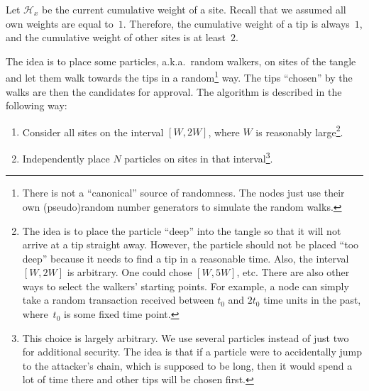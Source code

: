 \documentclass[12pt]{article}
\newcommand{\HH}{\mathcal{H}}
\begin{document}
\begin{CJK}{UTF8}{bkai}
Let $\HH_x$ be the current cumulative weight of a site.
 Recall that we assumed all 
own weights are equal to~$1$. Therefore, the cumulative weight of a tip
is always~$1$, and the cumulative weight of other sites is at least~$2$.

The idea is to place some particles, a.k.a.\ random walkers,
on sites of the tangle and let them walk towards the tips
in a random\footnote{There is not a ``canonical'' source of randomness.
The nodes just use their own (pseudo)random number generators
to simulate the random walks.} way. The tips ``chosen'' by the walks
are then the candidates for approval.
The algorithm is described in the following way:
\begin{enumerate}
 \item Consider all sites on the interval $[W,2W]$, where 
 $W$ is reasonably large\footnote{The idea is to place the particle ``deep'' into
the tangle so that it will not arrive at a tip straight away. However, the 
particle should not be placed ``too deep'' because it needs to find a tip
 in a reasonable time. Also, the interval $[W,2W]$ is arbitrary. 
One could chose $[W,5W]$, etc.
There are also other ways to select the walkers' starting points.
 For example, a node can simply
take a random transaction received between $t_0$ and
$2t_0$ time units in the past, where~$t_0$ is some fixed time point.}.

 \item Independently place $N$ particles on sites in that
  interval\footnote{This choice
is largely arbitrary. We use several particles instead of just two
for additional security. The idea is that if a particle
were to accidentally jump to the attacker's chain, which is supposed
to be long, then it would spend a lot of time there 
and other tips will be chosen first.}.
 

\end{enumerate}
\end{CJK}
\end{document}
